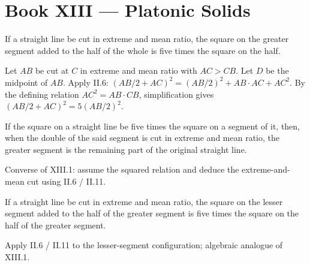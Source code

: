 %
%

\section{Book XIII --- Platonic Solids}
\label{sec:book-XIII}

\begin{claim}
\label{prop:XIII.1}
If a straight line be cut in extreme and mean ratio, the square on
the greater segment added to the half of the whole is five times the
square on the half.
\end{claim}
\begin{evidence}
\label{ev:XIII.1}
Let $AB$ be cut at $C$ in extreme and mean ratio with $AC > CB$.
Let $D$ be the midpoint of $AB$.  Apply II.6: $(AB/2 + AC)^2 =
(AB/2)^2 + AB \cdot AC + AC^2$.  By the defining relation $AC^2 =
AB \cdot CB$, simplification gives $(AB/2 + AC)^2 = 5 (AB/2)^2$.
\end{evidence}

\begin{claim}
\label{prop:XIII.2}
If the square on a straight line be five times the square on a
segment of it, then, when the double of the said segment is cut in
extreme and mean ratio, the greater segment is the remaining part of
the original straight line.
\end{claim}
\begin{evidence}
\label{ev:XIII.2}
Converse of XIII.1: assume the squared relation and deduce the
extreme-and-mean cut using II.6 / II.11.
\end{evidence}

\begin{claim}
\label{prop:XIII.3}
If a straight line be cut in extreme and mean ratio, the square on
the lesser segment added to the half of the greater segment is five
times the square on the half of the greater segment.
\end{claim}
\begin{evidence}
\label{ev:XIII.3}
Apply II.6 / II.11 to the lesser-segment configuration; algebraic
analogue of XIII.1.
\end{evidence}

